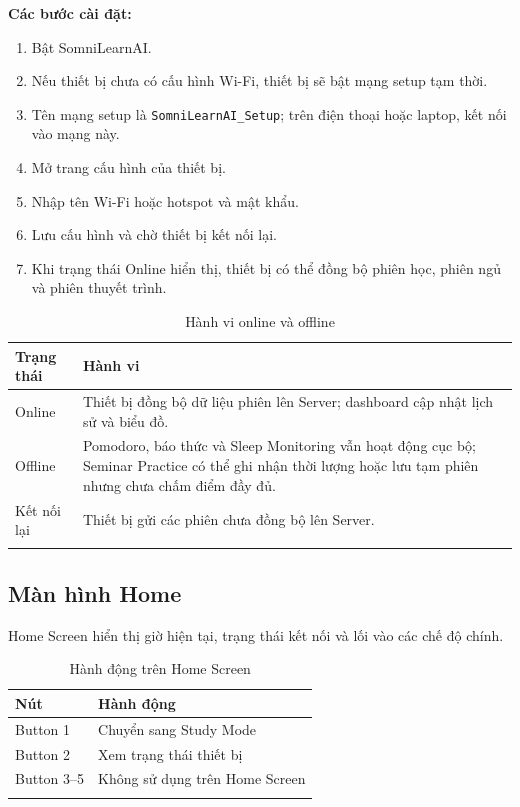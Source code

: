 \documentclass[12pt,a4paper]{article}
\begin{document}
\textbf{Các bước cài đặt:}

\begin{enumerate}
    \item Bật SomniLearnAI.
    \item Nếu thiết bị chưa có cấu hình Wi-Fi, thiết bị sẽ bật mạng setup tạm thời.
    \item Tên mạng setup là \texttt{SomniLearnAI\_Setup}; trên điện thoại hoặc laptop, kết nối vào mạng này.
    \item Mở trang cấu hình của thiết bị.
    \item Nhập tên Wi-Fi hoặc hotspot và mật khẩu.
    \item Lưu cấu hình và chờ thiết bị kết nối lại.
    \item Khi trạng thái Online hiển thị, thiết bị có thể đồng bộ phiên học, phiên ngủ và phiên thuyết trình.
\end{enumerate}

\begin{longtable}{|P{3cm}|P{11.5cm}|}
\hline
\textbf{Trạng thái} & \textbf{Hành vi} \\
\hline
Online & Thiết bị đồng bộ dữ liệu phiên lên Server; dashboard cập nhật lịch sử và biểu đồ. \\
\hline
Offline & Pomodoro, báo thức và Sleep Monitoring vẫn hoạt động cục bộ; Seminar Practice có thể ghi nhận thời lượng hoặc lưu tạm phiên nhưng chưa chấm điểm đầy đủ. \\
\hline
Kết nối lại & Thiết bị gửi các phiên chưa đồng bộ lên Server. \\
\hline
\caption{Hành vi online và offline}
\end{longtable}

\subsection{Màn hình Home}

Home Screen hiển thị giờ hiện tại, trạng thái kết nối và lối vào các chế độ chính.

\begin{longtable}{|P{3cm}|P{11.5cm}|}
\hline
\textbf{Nút} & \textbf{Hành động} \\
\hline
Button 1 & Chuyển sang Study Mode \\
\hline
Button 2 & Xem trạng thái thiết bị \\
\hline
Button 3--5 & Không sử dụng trên Home Screen \\
\hline
\caption{Hành động trên Home Screen}
\end{longtable}
\end{document}
